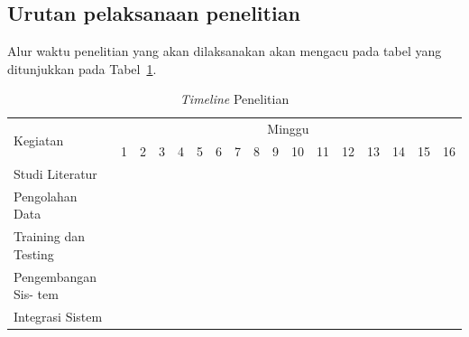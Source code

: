 \newpage

\subsection{Urutan pelaksanaan penelitian}

Alur waktu penelitian yang akan dilaksanakan akan mengacu pada tabel yang ditunjukkan pada Tabel~\ref{tb:timeline}.

\newcommand{\w}{}
\newcommand{\G}{\cellcolor{gray}}
\begin{table}[h!]
  \caption{\emph{Timeline} Penelitian}
  \label{tb:timeline}

  \begin{tabular}{|p{3.5cm}|c|c|c|c|c|c|c|c|c|c|c|c|c|c|c|c|}
    \hline
    \multirow{2}{*}{Kegiatan} & \multicolumn{16}{|c|}{Minggu}                                                                       \\
    \cline{2-17}              &
    1                         & 2                             & 3  & 4  & 5  & 6  & 7  & 8  & 9  & 10 & 11 & 12 & 13 & 14 & 15 & 16 \\
    \hline

    Studi Literatur           &
    \G                        & \G                            & \G & \G & \w & \w & \w & \w & \w & \w & \w & \w & \w & \w & \w & \w \\
    \hline

    Pengolahan Data           &
    \w                        & \w                            & \G & \G & \G & \G & \w & \w & \w & \w & \w & \w & \w & \w & \w & \w \\
    \hline

    Training dan Testing      &
    \w                        & \w                            & \w & \w & \w & \G & \G & \G & \G & \w & \w & \w & \w & \w & \w & \w \\
    \hline

    Pengembangan Sis- tem     &
    \w                        & \w                            & \w & \w & \G & \G & \G & \G & \G & \w & \w & \w & \w & \w & \w & \w \\
    \hline

    Integrasi Sistem          &
    \w                        & \w                            & \w & \w & \w & \w & \w & \w & \w & \G & \G & \w & \w & \w & \w & \w \\
    \hline


\end{tabular}
\end{table}
